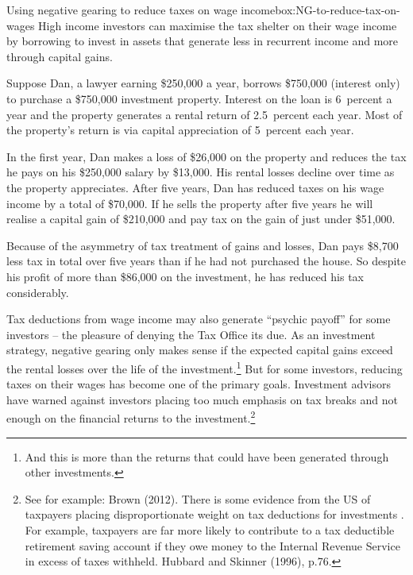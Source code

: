 \documentclass{grattan}\usepackage[]{graphicx}\usepackage[]{color}
\begin{document}
\begin{smallbox}{Using negative gearing to reduce taxes on wage income}{box:NG-to-reduce-tax-on-wages}
High income investors can maximise the tax shelter on their wage income
by borrowing to invest in assets that generate less in recurrent income
and more through capital gains.



Suppose Dan, a lawyer earning \$250,000 a year, 
borrows \$750,000 %
(interest only)
to purchase a \$750,000 investment property. Interest on the loan is 6~percent a
year and the property generates a rental return of 2.5~percent each
year. Most of the property's return is via capital appreciation of 5~percent each year.

In the first year, Dan makes a loss of \$26,000 
on the property and
reduces the tax he pays on his \$250,000 salary by 
\$13,000. His rental
losses decline over time as the property appreciates. After five years,
Dan has reduced taxes on his wage income by a total of 
\$70,000. If he
sells the property after five years he will realise a capital gain of
\$210,000 and pay tax on 
the gain of just under \$51,000.

Because of the asymmetry of tax treatment of gains and losses, Dan pays
\$8,700 less tax in total over five years than if he had not purchased
the house. So despite his profit of more than \$86,000 on the
investment, he has reduced his tax considerably.
\end{smallbox}
Tax deductions from wage income may also generate ``psychic payoff'' for
some investors -- the pleasure of denying the Tax Office its due. As an
investment strategy, negative gearing only makes sense if the expected
capital gains exceed the rental losses over the life of the
investment.\footnote{And this is more than the returns that could have
  been generated through other investments.} But for some investors,
reducing taxes on their wages has become one of the primary goals.
Investment advisors have warned against investors placing too much
emphasis on tax breaks and not enough on the financial returns to the
investment.\footnote{See for example: Brown (2012). There is some
  evidence from the US of taxpayers placing disproportionate weight on
  tax deductions for investments . For example, taxpayers are far more
  likely to contribute to a tax deductible retirement saving account if
  they owe money to the Internal Revenue Service in excess of taxes
  withheld. Hubbard and Skinner (1996), p.76.}
  
\end{document}
